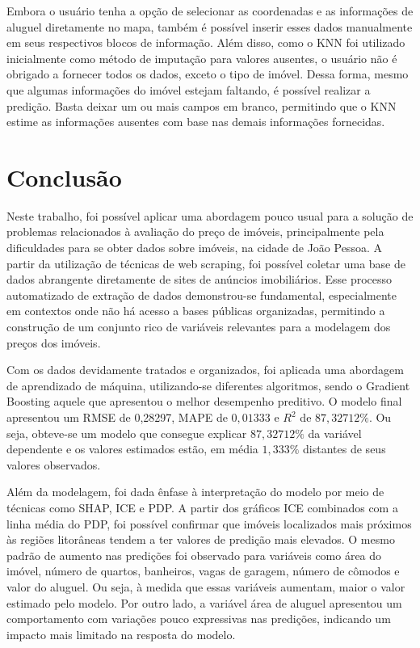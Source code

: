 \documentclass[
  12pt,
  a4paper,
]{scrreprt}
\begin{document}
Embora o usuário tenha a opção de selecionar as coordenadas e as
informações de aluguel diretamente no mapa, também é possível inserir
esses dados manualmente em seus respectivos blocos de informação. Além
disso, como o KNN foi utilizado inicialmente como método de imputação
para valores ausentes, o usuário não é obrigado a fornecer todos os
dados, exceto o tipo de imóvel. Dessa forma, mesmo que algumas
informações do imóvel estejam faltando, é possível realizar a predição.
Basta deixar um ou mais campos em branco, permitindo que o KNN estime as
informações ausentes com base nas demais informações fornecidas.

\chapter{Conclusão}\label{conclusuxe3o}

Neste trabalho, foi possível aplicar uma abordagem pouco usual para a
solução de problemas relacionados à avaliação do preço de imóveis,
principalmente pela dificuldades para se obter dados sobre imóveis, na
cidade de João Pessoa. A partir da utilização de técnicas de web
scraping, foi possível coletar uma base de dados abrangente diretamente
de sites de anúncios imobiliários. Esse processo automatizado de
extração de dados demonstrou-se fundamental, especialmente em contextos
onde não há acesso a bases públicas organizadas, permitindo a construção
de um conjunto rico de variáveis relevantes para a modelagem dos preços
dos imóveis.

\vspace{12pt}

Com os dados devidamente tratados e organizados, foi aplicada uma
abordagem de aprendizado de máquina, utilizando-se diferentes
algoritmos, sendo o Gradient Boosting aquele que apresentou o melhor
desempenho preditivo. O modelo final apresentou um RMSE de 0,28297, MAPE
de \(0,01333\) e \(R^2\) de \(87,32712\%\). Ou seja, obteve-se um modelo
que consegue explicar \(87,32712\%\) da variável dependente e os valores
estimados estão, em média \(1,333\%\) distantes de seus valores
observados.

\vspace{12pt}

Além da modelagem, foi dada ênfase à interpretação do modelo por meio de
técnicas como SHAP, ICE e PDP. A partir dos gráficos ICE combinados com
a linha média do PDP, foi possível confirmar que imóveis localizados
mais próximos às regiões litorâneas tendem a ter valores de predição
mais elevados. O mesmo padrão de aumento nas predições foi observado
para variáveis como área do imóvel, número de quartos, banheiros, vagas
de garagem, número de cômodos e valor do aluguel. Ou seja, à medida que
essas variáveis aumentam, maior o valor estimado pelo modelo. Por outro
lado, a variável área de aluguel apresentou um comportamento com
variações pouco expressivas nas predições, indicando um impacto mais
limitado na resposta do modelo.
\end{document}
